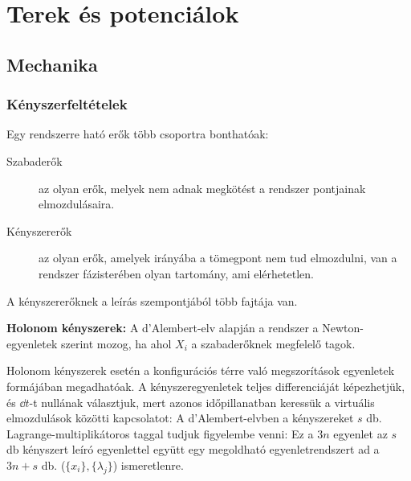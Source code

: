\chapter{Terek \'es potenci\'alok}
 
 \section{Mechanika}
  
  \subsection{Kényszerfeltételek}\label{ss3:kenyszerfeletetelek}
   
   Egy rendszerre ható erők több csoportra bonthatóak:
   \begin{description}
    \item[Szabaderők] az olyan erők, melyek nem adnak megkötést a rendszer pontjainak elmozdulásaira.
    \item[Kényszererők] az olyan erők, amelyek irányába a tömegpont nem tud elmozdulni, van a rendszer fázisterében olyan tartomány, ami elérhetetlen. 
   \end{description}
   
   A kényszererőknek a leírás szempontjából több fajtája van.
   
   {\bf Holonom kényszerek:}
   A d'Alembert-elv alapján a rendszer a Newton-egyenletek szerint mozog, ha 
   ahol $X_i$ a szabaderőknek megfelelő tagok.
   
   Holonom kényszerek esetén a konfigurációs térre való megszorítások egyenletek formájában megadhatóak.
   A kényszeregyenletek teljes differenciáját képezhetjük, és $\dd t$-t nullának választjuk, mert azonos időpillanatban keressük a virtuális elmozdulások közötti kapcsolatot:
   A d'Alembert-elvben a kényszereket $s$ db.
   Lagrange-multiplikátoros taggal tudjuk figyelembe venni:
   Ez a $3n$ egyenlet az $s$ db kényszert leíró egyenlettel együtt egy megoldható egyenletrendszert ad a $3n+s$ db. ($\{x_i\}, \{\lambda_j\}$) ismeretlenre.
    
